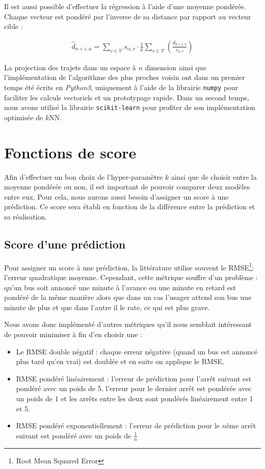 \documentclass[letterpaper]{article}
\begin{document}
Il est aussi possible d'effectuer la régression à l'aide d'une moyenne pondérée. Chaque vecteur est pondéré par l'inverse de sa distance par rapport au vecteur cible :

\begin{eqnarray}
\hat{d}_{n+i,\alpha} = \sum_{v \in \mathcal{V}} s_{\alpha, v} \cdot \frac{1}{k} \sum_{v \in \mathcal{V}}( \frac{d_{n+i,v}}{s_{\alpha, v}})
\end{eqnarray}

La projection des trajets dans un espace à $n$ dimension ainsi que l'implémentation de l'algorithme des plus proches voisin ont dans un premier temps été écrits en \textit{Python3}, uniquement à l'aide de la librairie \texttt{numpy} pour faciliter les calculs vectoriels et un prototypage rapide. Dans un second temps, nous avons utilisé la librairie \texttt{scikit-learn} pour profiter de son implémentation optimisée de $k$NN.

\section{Fonctions de score}

Afin d'effectuer un bon choix de l'hyper-paramètre $k$ ainsi que de choisir entre la moyenne pondérée ou non, il est important de pouvoir comparer deux modèles entre eux. Pour cela, nous aurons aussi besoin d'assigner un score à une prédiction. Ce score sera établi en fonction de la différence entre la prédiction et sa réalisation.

\subsection{Score d'une prédiction}
Pour assigner un score à une prédiction, la littérature utilise souvent le RMSE\footnote{Root Mean Squared Error}: l'erreur quadratique moyenne.
Cependant, cette métrique souffre d'un problème :
qu'un bus soit annoncé une minute à l'avance ou une minute en retard est pondéré de la même manière alors que dans un cas l'usager attend son bus une minute de plus et que dans l'autre il le rate, ce qui est plus grave.

Nous avons donc implémenté d'autres métriques qu'il nous semblait intéressant de pouvoir minimiser à fin d'en choisir une :
\begin{itemize}
    \item Le RMSE double négatif : chaque erreur négative (quand un bus est annoncé plus tard qu'en vrai) est doublée et en suite on applique le RMSE.
    \item RMSE pondéré linéairement : l'erreur de prédiction pour l'arrêt suivant est pondéré avec un poids de 5, l'erreur pour le dernier arrêt est pondérée avec un poids de 1 et les arrêts entre les deux sont pondérés linéairement entre 1 et 5.
    \item RMSE pondéré exponentiellement : l'erreur de prédiction pour le $n$ème arrêt suivant est pondéré avec un poids de $\frac{1}{n}$
\end{itemize}
\vspace{1em}
\end{document}
